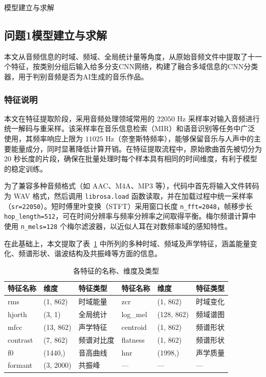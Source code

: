 \documentclass[aspectratio=169]{beamer}
\begin{document}
\begin{frame}{模型建立与求解}
\small
\subsection{问题1模型建立与求解}
本文从音频信息的时域、频域、全局统计量等角度，从原始音频文件中提取了十一个特征，按类别分组后输入给多分支CNN网络，构建了融合多域信息的CNN分类器，用于判别音频是否为AI生成的音乐作品。


\subsubsection{特征说明}
本文在特征提取阶段，采用音频处理领域常用的 $22050$ Hz 采样率对输入音频进行统一解码与重采样。该采样率在音乐信息检索（MIR）和语音识别等任务中广泛使用，其频率响应上限为 $11025$ Hz（奈奎斯特频率），能够保留音乐与人声中的主要能量成分，同时显著降低计算开销。在特征提取流程中，原始歌曲首先被切分为 20 秒长度的片段，确保在批量处理时每个样本具有相同的时间维度，有利于模型的稳定训练。

为了兼容多种音频格式（如 AAC、M4A、MP3 等），代码中首先将输入文件转码为 WAV 格式，然后调用 \texttt{librosa.load} 函数读取，并在加载过程中统一采样率（\texttt{sr=22050}）。短时傅里叶变换（STFT）采用窗口长度 \texttt{n\_fft=2048}，帧移步长 \texttt{hop\_length=512}，可在时间分辨率与频率分辨率之间取得平衡。梅尔频谱计算中使用 \texttt{n\_mels=128} 个梅尔滤波器，以近似人耳在对数频率域的感知特性。

在此基础上，本文提取了表~\ref{tab:audio-features} 中所列的多种时域、频域及声学特征，涵盖能量变化、频谱形状、谐波结构及共振峰等方面的信息。

\begin{table}[h]
  \centering
  \begin{tabular}{lll lll}
    \toprule
    特征名称 & 维度 & 特征类型 & 特征名称 & 维度 & 特征类型 \\
    \midrule
    rms       & (1, 862)   & 时域能量    & zcr       & (1, 862)   & 时域变化       \\
    hjorth    & (3, 1)     & 全局统计    & log\_mel  & (128, 862) & 频域谱图       \\
    mfcc      & (13, 862)  & 声学特征    & centroid  & (1, 862)   & 频谱形状       \\
    contrast  & (7, 862)   & 频谱对比度  & flatness  & (1, 862)   & 频谱形状       \\
    f0        & (1440,)    & 音高曲线    & hnr       & (1998,)    & 声学质量       \\
    formant   & (3, 2000)  & 共振峰      & —         & —          & —             \\
    \bottomrule
  \end{tabular}
  \caption{各特征的名称、维度及类型}\label{tab:audio-features}
\end{table}


\end{frame}
\end{document}
